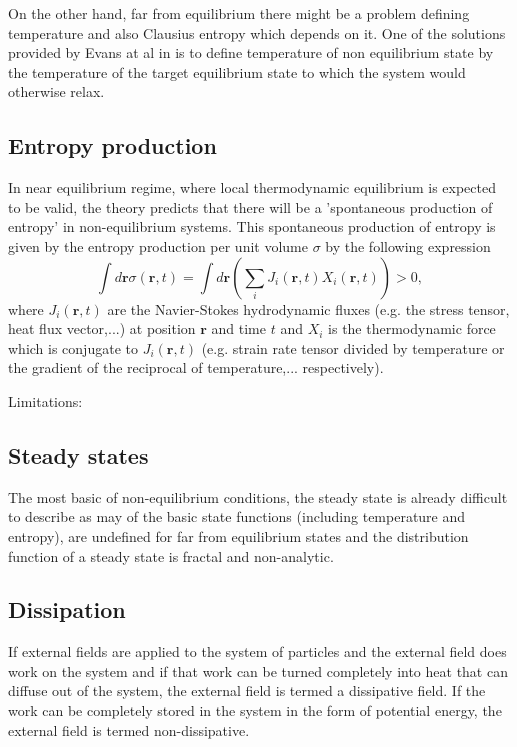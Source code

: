 \documentclass[a4paper,12pt,nofootinbib]{article}
\begin{document}
On the other hand, far from equilibrium there might be a problem defining temperature and also Clausius entropy which depends on it. One of the solutions provided by Evans at al in  is to define temperature of non equilibrium state by the temperature of the target equilibrium state to which the system would otherwise relax.

\subsection{Entropy production}

In near equilibrium regime, where local thermodynamic equilibrium is expected to be valid, the theory predicts that there will be a 'spontaneous production of entropy' in non-equilibrium systems.
This spontaneous production of entropy is given by the entropy production per unit volume $\sigma$ by the following expression \cite{DeGroot:1984ue}
\begin{displaymath}
  \int d\bm{r} \sigma(\bm{r},t)=\int d\bm{r}(\sum_i J_i(\bm{r},t)X_i(\bm{r},t))>0,
\end{displaymath}
where $J_i(\bm{r},t)$ are the Navier-Stokes hydrodynamic fluxes (e.g. the stress tensor, heat flux vector,...) at position $\bm{r}$ and time $t$ and $X_i$ is the thermodynamic force which is conjugate to $J_i(\bm{r},t)$ (e.g. strain rate tensor divided by temperature or the gradient of the reciprocal of temperature,... respectively).

Limitations:

\subsection{Steady states}
The most basic of non-equilibrium conditions, the steady state is already difficult to describe as may of the basic state functions (including temperature and entropy), are undefined for far from equilibrium states and the distribution function of a steady state is fractal and non-analytic. 


\subsection{Dissipation}

If external fields are applied to the system of particles and the external field does work on the system and if that work can be turned completely into heat that can diffuse out of the system, the external field is termed a dissipative field. If the work can be completely stored in the system in the form of potential energy, the external field is termed non-dissipative.
\end{document}
